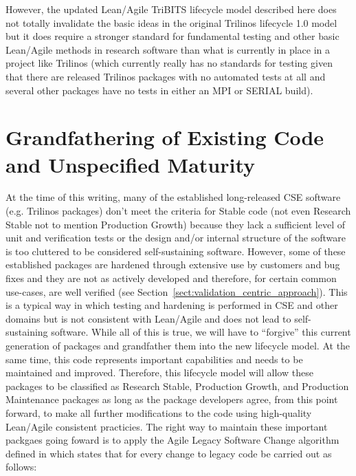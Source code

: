 \documentclass[11pt]{SANDreport}
\begin{document}
However, the updated Lean/Agile TriBITS lifecycle model described here
does not totally invalidate the basic ideas in the original Trilinos
lifecycle 1.0 model but it does require a stronger standard for
fundamental testing and other basic Lean/Agile methods in research
software than what is currently in place in a project like Trilinos
(which currently really has no standards for testing given that there
are released Trilinos packages with no automated tests at all and
several other packages have no tests in either an MPI or SERIAL
build).


%
{}\section{Grandfathering of Existing Code and Unspecified Maturity}
\label{sec:grandfathering}
%

At the time of this writing, many of the established long-released CSE
software (e.g. Trilinos packages) don't meet the criteria for Stable
code (not even Research Stable not to mention Production Growth)
because they lack a sufficient level of unit and verification tests or
the design and/or internal structure of the software is too cluttered
to be considered self-sustaining software.  However, some of these
established packages are hardened through extensive use by customers
and bug fixes and they are not as actively developed and therefore,
for certain common use-cases, are well verified (see
Section~\ref{sect:validation_centric_approach}).  This is a typical
way in which testing and hardening is performed in CSE and other
domains but is not consistent with Lean/Agile and does not lead to
self-sustaining software.  While all of this is true, we will have to
``forgive'' this current generation of packages and grandfather them
into the new lifecycle model.  At the same time, this code represents
important capabilities and needs to be maintained and improved.
Therefore, this lifecycle model will allow these packages to be
classified as Research Stable, Production Growth, and Production
Maintenance packages as long as the package developers agree, from
this point forward, to make all further modifications to the code
using high-quality Lean/Agile consistent practicies.  The right way to
maintain these important packgaes going foward is to apply the Agile
Legacy Software Change algorithm defined in
{}\cite{WorkingEffectivelyWithLegacyCode05} which states that for
every change to legacy code be carried out as follows:
\end{document}
